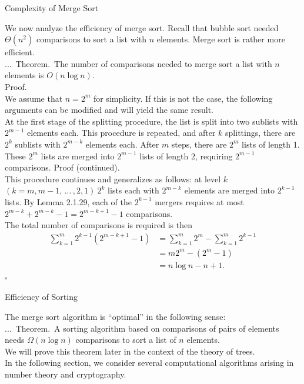\documentclass[smaller,hyperref={CJKbookmarks=true}]{beamer}
\newenvironment{PROOF}{{\noindent\!\sf\alert{Proof.}}\\}{\hfill$\square$\\}
\newcounter{zhuo}[subsection]
\renewcommand{\thezhuo}{\thesection.\thesubsection.\arabic{zhuo}}
\newenvironment{THEOREM}{\stepcounter{zhuo}\alert{\thezhuo.~Theorem.\,}}{}
\begin{document}
\begin{frame}{Complexity of Merge Sort}
\begin{spacing}{1.1}
We now analyze the efficiency of merge sort. Recall that bubble sort needed $\Theta(n^2)$ comparisons to sort a list with $n$ elements. Merge sort is rather more efficient.\\[6pt]
\begin{THEOREM}
The number of comparisons needed to merge sort a list with $n$ elements is $O(n\log n)$.\\[6pt]
\end{THEOREM}
\begin{PROOF}
We assume that $n=2^m$ for simplicity. If this is not the case, the following
arguments can be modified and will yield the same result.\\[5pt]
At the first stage of the splitting procedure, the list is split into two
sublists with $2^{m-1}$ elements each. This procedure is repeated, and after $k$ splittings, there are $2^k$ sublists with $2^{m-k}$ elements each. After $m$ steps, there are $2^m$ lists of length 1. These $2^m$ lists are merged into $2^{m-1}$ lists of length 2, requiring $2^{m-1}$ comparisons.
\newpage
\alert{Proof (continued).}\\
This procedure continues and generalizes as follows: at level $k$\\
$(k=m,m-1,\,...\,,2,1)~2^k$ lists each with $2^{m-k}$ elements are merged into $2^{k-1}$ lists. By Lemma 2.1.29, each of the $2^{k-1}$ mergers requires at most $2^{m-k}+2^{m-k}-1=2^{m-k+1}-1$ comparisons.\\[6pt]
The total number of comparisons is required is then
\begin{equation*}
  \begin{split}
     \sum_{k=1}^{m}2^{k-1}(2^{m-k+1}-1) &=\sum_{k=1}^{m}2^m-\sum_{k=1}^{m}2^{k-1} \\
       &=m2^m-(2^m-1) \\
       &=n\log n-n+1.
  \end{split}
\end{equation*}
\end{PROOF}
\end{spacing}
\end{frame}
\begin{frame}[c]{Efficiency of Sorting}
\begin{spacing}{1.2}
The merge sort algorithm is ``optimal'' in the following sense:\\[5pt]
\begin{THEOREM}
A sorting algorithm based on comparisons of pairs of elements needs $\Omega(n\log n)$ comparisons to sort a list of $n$ elements.\\[5pt]
We will prove this theorem later in the context of the theory of trees.\\[5pt]
In the following section, we consider several computational algorithms
arising in number theory and cryptography.
\end{THEOREM}
\end{spacing}
\end{frame}
\end{document}
